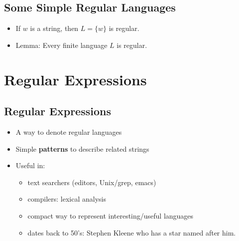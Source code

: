 \subsection{Some Simple Regular Languages}
\begin{itemize}
    \item If $w$ is a string, then $L = \{ w \}$ is regular.
    \item Lemma: Every finite language $L$ is regular.
\end{itemize}

\section{Regular Expressions}

\subsection{Regular Expressions}
\begin{itemize}
    \item A way to denote regular languages
    \item Simple \textbf{patterns} to describe related strings
    \item Useful in:
    \begin{itemize}
        \item text searchers (editors, Unix/grep, emacs)
        \item compilers: lexical analysis
        \item compact way to represent interesting/useful languages
        \item dates back to 50's: Stephen Kleene who has a star named after him.
    \end{itemize}
\end{itemize}

